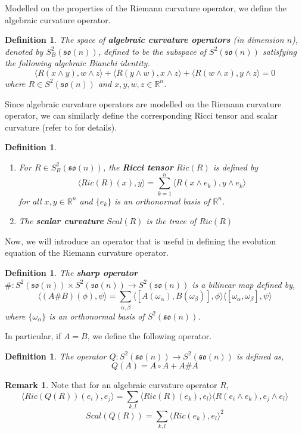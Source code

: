 \documentclass[12pt]{amsart}
\newtheorem{definition}[theorem]{Definition}
\theoremstyle{definition}
\newtheorem{remark}[theorem]{Remark}
\numberwithin{equation}{section}
\begin{document}
   \noindent Modelled on the properties of the Riemann curvature operator, we define the algebraic curvature operator.
\begin{definition}
    The space of \textbf{algebraic curvature operators} (in dimension $n$), denoted by $S_{B}^{2}(\mathfrak{so}(n))$, defined to be the subspace of $S^{2}(\mathfrak{so}(n))$ satisfying the following algebraic Bianchi identity.
    $$\langle R(x \wedge y), w \wedge z\rangle  + \langle R(y\wedge w),x \wedge z\rangle  + \langle R(w \wedge x), y \wedge z\rangle  = 0$$
    where $R \in S^{2}(\mathfrak{so}(n))$ and $x,y,w,z \in \mathbb{R}^{n}$.
    \end{definition}
    Since algebraic curvature operators are modelled on the Riemann curvature operator, we can similarly define the corresponding Ricci tensor and scalar curvature (refer to \cite{BCRF} for details).
    \begin{definition}
        \begin{enumerate}
            \item  For $R \in S_{B}^{2}(\mathfrak{so}(n))$, the \textbf{Ricci tensor} $Ric(R)$ is defined by
    $$\langle Ric(R)(x),y\rangle  = \sum_{k = 1}^{n} \langle R(x \wedge e_{k}), y \wedge e_{k} \rangle $$
    for all $x,y \in \mathbb{R}^{n}$ and $\{e_{k}\}$ is an orthonormal basis of $\mathbb{R}^{n}$.
    \item The \textbf{scalar curvature} $Scal(R)$ is the trace of $Ric(R)$
        \end{enumerate}
    \end{definition}
    
     Now, we will introduce an operator that is useful in defining the evolution equation of the Riemann curvature operator.
     \begin{definition}
           The \textbf{sharp operator} $\# : S^{2}(\mathfrak{so}(n)) \times S^{2}(\mathfrak{so}(n)) \rightarrow S^{2}(\mathfrak{so}(n))$ is a bilinear map defined by,
    $$\langle (A \# B)(\phi), \psi\rangle  = \sum_{\alpha, \beta} \langle [A(\omega _{\alpha}),B(\omega_{\beta})], \phi\rangle \langle [\omega_{\alpha}, \omega_{\beta}], \psi\rangle $$
    where  $\{\omega_{\alpha}\}$ is an orthonormal basis of $S^{2}(\mathfrak{so}(n))$.
     \end{definition}
   In particular, if $A = B$, we define the following operator.
   \begin{definition}
         The operator $Q : S^{2}(\mathfrak{so}(n))  \rightarrow S^{2}(\mathfrak{so}(n))$ is defined as,
    $$Q(A) = A \circ A + A \# A$$
   \end{definition}
    \begin{remark}
        Note that for an algebraic curvature operator $R$,
         $$\langle Ric(Q(R))(e_{i}),e_{j}\rangle  = \sum_{k,l}\langle  Ric(R)(e_{k}),e_{l} \rangle  \langle R(e_{i} \wedge e_{k}),e_{j} \wedge e_{l}\rangle  $$
    $$Scal(Q(R)) = \sum_{k,l} \langle Ric(e_{k}),e_{l}\rangle ^{2}$$
    \end{remark}
\end{document}
